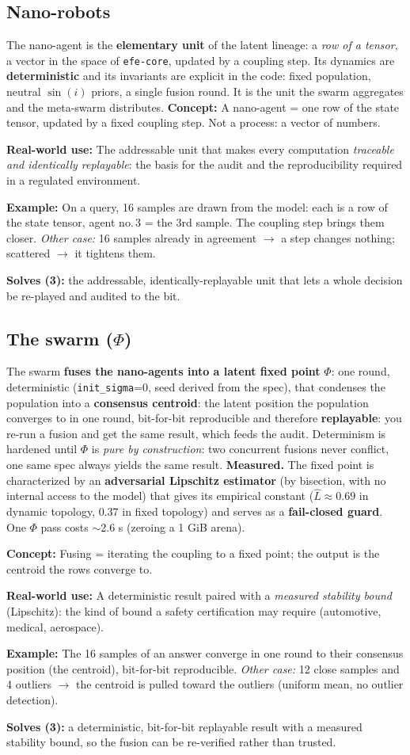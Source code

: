 \documentclass[11pt]{article}
\newcommand{\mesure}[1]{{\color{efeteal}\textbf{Measured.} }#1\par}
\newcommand{\concept}[1]{{\color{efenavy}\textbf{Concept:} }#1\par}
\newcommand{\exemple}[1]{{\color{efeamber}\textbf{Example:} }#1\par}
\newcommand{\utilite}[1]{{\color{efeplum}\textbf{Real-world use:} }#1\par}
\newcommand{\solves}[2]{{\color{efesolve}\textbf{Solves #1:} }#2\par}
\begin{document}
\subsection{Nano-robots}
The nano-agent is the \textbf{elementary unit} of the latent lineage: a \emph{row of a tensor}, a
vector in the space of \texttt{efe-core}, updated by a coupling step. Its dynamics are
\textbf{deterministic} and its invariants are explicit in the code: fixed population, neutral
$\sin(i)$ priors, a single fusion round. It is the unit the swarm aggregates and the meta-swarm
distributes.
\concept{A nano-agent = one row of the state tensor, updated by a fixed coupling step. Not a
process: a vector of numbers.}
\utilite{The addressable unit that makes every computation \emph{traceable and identically
replayable}: the basis for the audit and the reproducibility required in a regulated environment.}
\exemple{On a query, 16 samples are drawn from the model: each is a row of the state tensor, agent
no.\,3 = the 3rd sample. The coupling step brings them closer. \emph{Other case:} 16 samples already
in agreement $\rightarrow$ a step changes nothing; scattered $\rightarrow$ it tightens them.}
\solves{(3)}{the addressable, identically-replayable unit that lets a whole decision be re-played and audited to the bit.}

\subsection{The swarm ($\Phi$)}
The swarm \textbf{fuses the nano-agents into a latent fixed point} $\Phi$: one round, deterministic
(\texttt{init\_sigma}=0, seed derived from the spec), that condenses the population into a
\textbf{consensus centroid}: the latent position the population converges to in one round,
bit-for-bit reproducible and therefore \textbf{replayable}: you re-run a fusion and get the same
result, which feeds the audit. Determinism is hardened until $\Phi$ is \emph{pure by construction}:
two concurrent fusions never conflict, one same spec always yields the same result.
\mesure{The fixed point is characterized by an \textbf{adversarial Lipschitz estimator} (by
bisection, with no internal access to the model) that gives its empirical constant ($\hat{L}\approx0.69$ in dynamic topology, $0.37$ in fixed topology) and serves as a \textbf{fail-closed guard}. One $\Phi$ pass costs $\sim$2.6 s (zeroing a 1 GiB arena).}
\concept{Fusing = iterating the coupling to a fixed point; the output is the centroid the rows
converge to.}
\utilite{A deterministic result paired with a \emph{measured stability bound} (Lipschitz): the kind
of bound a safety certification may require (automotive, medical, aerospace).}
\exemple{The 16 samples of an answer converge in one round to their consensus position (the
centroid), bit-for-bit reproducible. \emph{Other case:} 12 close samples and 4 outliers
$\rightarrow$ the centroid is pulled toward the outliers (uniform mean, no outlier detection).}
\solves{(3)}{a deterministic, bit-for-bit replayable result with a measured stability bound, so the fusion can be re-verified rather than trusted.}
\end{document}
